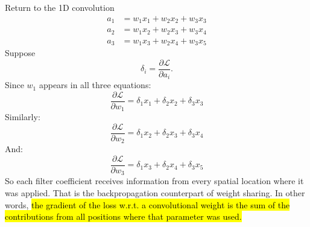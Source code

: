 \highspace
\begin{examplebox}
    Return to the 1D convolution
    \begin{equation*}
        \begin{aligned}
            a_1 &= w_1x_1+w_2x_2+w_3x_3\\
            a_2 &= w_1x_2+w_2x_3+w_3x_4\\
            a_3 &= w_1x_3+w_2x_4+w_3x_5
        \end{aligned}
    \end{equation*}
    Suppose
    \begin{equation*}
        \delta_i
        =
        \frac{\partial\mathcal L}{\partial a_i}.
    \end{equation*}
    Since $w_1$ appears in all three equations:
    \begin{equation*}
        \frac{\partial\mathcal L}{\partial w_1}
        =
        \delta_1x_1
        +
        \delta_2x_2
        +
        \delta_3x_3
    \end{equation*}
    Similarly:
    \begin{equation*}
        \frac{\partial\mathcal L}{\partial w_2}
        =
        \delta_1x_2
        +
        \delta_2x_3
        +
        \delta_3x_4
    \end{equation*}
    And:
    \begin{equation*}
        \frac{\partial\mathcal L}{\partial w_3}
        =
        \delta_1x_3
        +
        \delta_2x_4
        +
        \delta_3x_5
    \end{equation*}
    So each filter coefficient receives information from every spatial location where it was applied. That is the backpropagation counterpart of weight sharing. In other words, \hl{the gradient of the loss w.r.t. a convolutional weight is the sum of the contributions from all positions where that parameter was used.}
\end{examplebox}

\newpage

